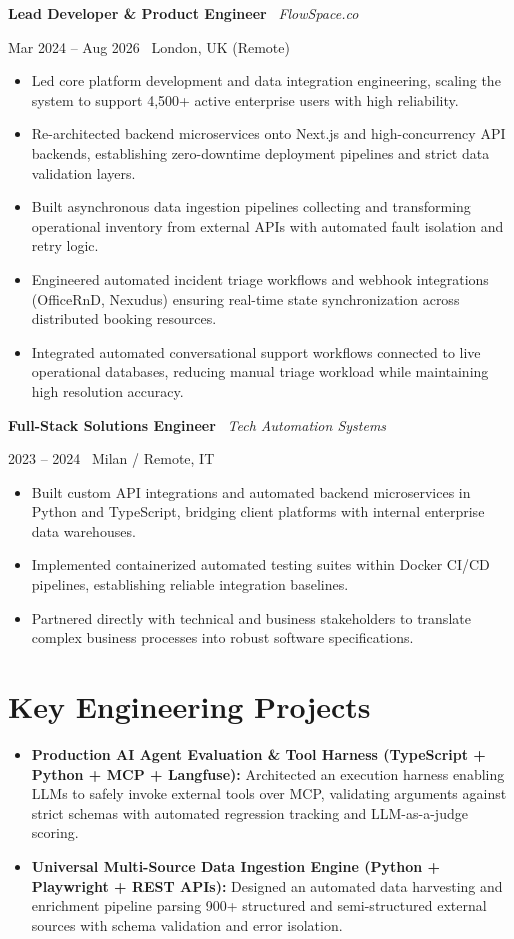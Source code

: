 \documentclass[a4paper,10pt]{article}
\newcommand{\role}[4]{%
  \vspace{2pt}\noindent
  \begin{minipage}[t]{0.70\textwidth}\raggedright\textbf{#1} \textbullet\ \textit{#3}\end{minipage}%
  \hfill
  \begin{minipage}[t]{0.28\textwidth}\raggedleft\footnotesize\color{gray}#2 \textbullet\ #4\end{minipage}%
  \vspace{1pt}%
}
\begin{document}
\vspace{3pt}
\role{Lead Developer \& Product Engineer}{Mar 2024 -- Aug 2026}{FlowSpace.co}{London, UK (Remote)}
\begin{itemize}
  \item Led core platform development and data integration engineering, scaling the system to support 4,500+ active enterprise users with high reliability.
  \item Re-architected backend microservices onto Next.js and high-concurrency API backends, establishing zero-downtime deployment pipelines and strict data validation layers.
  \item Built asynchronous data ingestion pipelines collecting and transforming operational inventory from external APIs with automated fault isolation and retry logic.
  \item Engineered automated incident triage workflows and webhook integrations (OfficeRnD, Nexudus) ensuring real-time state synchronization across distributed booking resources.
  \item Integrated automated conversational support workflows connected to live operational databases, reducing manual triage workload while maintaining high resolution accuracy.
\end{itemize}

\vspace{3pt}
\role{Full-Stack Solutions Engineer}{2023 -- 2024}{Tech Automation Systems}{Milan / Remote, IT}
\begin{itemize}
  \item Built custom API integrations and automated backend microservices in Python and TypeScript, bridging client platforms with internal enterprise data warehouses.
  \item Implemented containerized automated testing suites within Docker CI/CD pipelines, establishing reliable integration baselines.
  \item Partnered directly with technical and business stakeholders to translate complex business processes into robust software specifications.
\end{itemize}

\section{Key Engineering Projects}
\begin{itemize}
  \item \textbf{Production AI Agent Evaluation \& Tool Harness (TypeScript + Python + MCP + Langfuse):} Architected an execution harness enabling LLMs to safely invoke external tools over MCP, validating arguments against strict schemas with automated regression tracking and LLM-as-a-judge scoring.
  \item \textbf{Universal Multi-Source Data Ingestion Engine (Python + Playwright + REST APIs):} Designed an automated data harvesting and enrichment pipeline parsing 900+ structured and semi-structured external sources with schema validation and error isolation.
\end{itemize}
\end{document}
